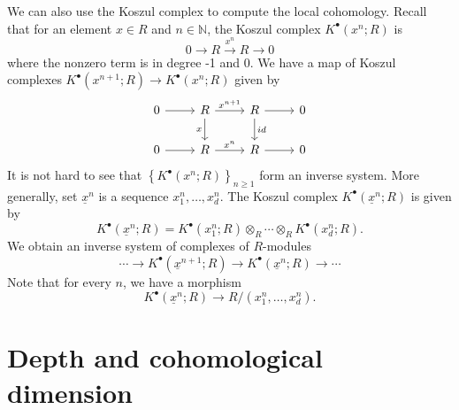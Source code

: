 We can also use the Koszul complex to compute the local cohomology. Recall that for an element \(x\in R\) and \(n\in \mathbb{N}\), the Koszul complex \(K^\bullet(x^n;R)\) is 
\[0\rightarrow R\xrightarrow{x^n} R\rightarrow 0\]
where the nonzero term is in degree -1 and 0. We have a map of Koszul complexes \(K^\bullet(x^{n+1};R)\rightarrow K^\bullet(x^n;R)\) given by 
\[\begin{tikzcd}
    0 & R & R & 0 \\
    0 & R & R & 0
    \arrow[from=1-1, to=1-2]
    \arrow["{x^{n+1}}", from=1-2, to=1-3]
    \arrow["x"', from=1-2, to=2-2]
    \arrow[from=1-3, to=1-4]
    \arrow["id", from=1-3, to=2-3]
    \arrow[from=2-1, to=2-2]
    \arrow["{x^n}", from=2-2, to=2-3]
    \arrow[from=2-3, to=2-4]
  \end{tikzcd}\]
It is not hard to see that \(\left\{ K^\bullet(x^n;R) \right\}_{n\geq 1}\) form an inverse system. More generally, set \(\underline{x}^n\) is a sequence \(x_1^n,\ldots,x_d^n\). The Koszul complex \(K^\bullet(\underline{x}^n;R)\) is given by 
\[K^\bullet(\underline{x}^n;R)=K^\bullet(x_1^n;R)\otimes_R\cdots\otimes_RK^\bullet(x_d^n;R).\]
We obtain an inverse system of complexes of \(R\)-modules 
\[\cdots\rightarrow K^\bullet(\underline{x}^{n+1};R)\rightarrow K^\bullet(\underline{x}^n;R)\rightarrow \cdots\]
Note that for every \(n\), we have a morphism
\[K^\bullet(\underline{x}^n;R)\rightarrow R/(x_1^n,\ldots,x_d^n).\]

\section{Depth and cohomological dimension}

